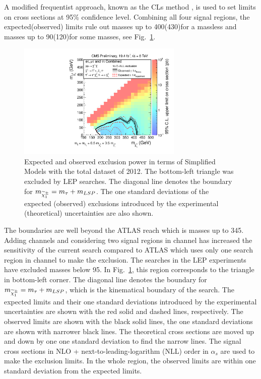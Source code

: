 A modified frequentist approach, known as the CLs method \cite{read:CLs}, is used to 
set limits on cross sections at 95\% confidence level.
Combining all four signal regions,
the expected(observed) limits rule out \chione  masses up to 400(430)\GeV  for a massless \PSGczDo and  
\PSGczDo masses up to 90(120)\GeV for some  \chione masses,
see Fig.~\ref{fig:limit_final}. 
\begin{linenomath}
\begin{figure}[!Hhtb]
\centering
\includegraphics[width=0.7\textwidth,keepaspectratio=true]{StatisticsFig/Exclusion4Bins.pdf}
\caption{Expected and observed exclusion power in terms of Simplified Models
with the total dataset of 2012. The bottom-left triangle was excluded by LEP \sTau searches. 
The diagonal line denotes the boundary for $m_{\widetilde{\chi}^{\pm}_1} = m_{\tau} + m_{LSP}$.
The one standard deviations of the expected (observed) exclusions introduced by the experimental 
(theoretical) uncertainties are also shown.}
\label{fig:limit_final}
\end{figure}
\end{linenomath}
The boundaries are well beyond the ATLAS reach which is \chione  masses up to 345\GeV \cite{Aad:2014yka}. Adding \leptonTau channels
and considering two signal regions in \tauTau channel has increased the sensitivity of the current search compared to ATLAS which uses only 
one search region in \tauTau channel to make the exclusion.
The \sTau searches in the LEP experiments \cite{lepsusy} have excluded masses below 95\GeV. In Fig.~\ref{fig:limit_final}, 
this region corresponds to the triangle in bottom-left corner. %
The diagonal line denotes the boundary for $m_{\widetilde{\chi}^{\pm}_1} = m_{\tau} + m_{LSP}$, which is the kinematical boundary of the search.
The expected limits and their one standard deviations introduced by the experimental 
uncertainties are shown with the red solid and dashed lines, respectively. The observed limits are shown with the black solid lines, the one 
standard deviations are shown with narrower black lines. The theoretical cross sections are moved up and down by one one standard deviation to 
find the narrow lines.
The signal cross sections in NLO + next-to-leading-logarithm (NLL) order in $\alpha_s$ are used to make the exclusion limits.
In the whole region, the observed limits are within one standard deviation from the expected limits.  

